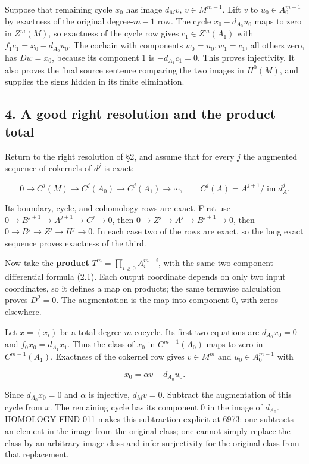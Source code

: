 \documentclass[11pt]{article}
\begin{document}
Suppose that remaining cycle \(x_0\) has image \(d_Mv\), \(v\in M^{m-1}\). Lift \(v\) to \(u_0\in A_0^{m-1}\) by exactness of the original degree-\(m-1\) row. The cycle \(x_0-d_{A_0}u_0\) maps to zero in \(Z^m(M)\), so exactness of the cycle row gives \(c_1\in Z^m(A_1)\) with \(f_1c_1=x_0-d_{A_0}u_0\). The cochain with components \(w_0=u_0,w_1=c_1\), all others zero, has \(Dw=x_0\), because its component 1 is \(-d_{A_1}c_1=0\). This proves injectivity. It also proves the final source sentence comparing the two images in \(H^0(M)\), and supplies the signs hidden in its finite elimination.

\subsection{4. A good right resolution and the product total}\label{note-08-a-good-right-resolution-and-the-product-total}

Return to the right resolution of §2, and assume that for every \(j\) the augmented sequence of cokernels of \(d^j\) is exact:

\[
0\to C^j(M)\to C^j(A_0)\to C^j(A_1)\to\cdots,
\qquad C^j(A)=A^{j+1}/\operatorname{im}d_A^j.
\]

Its boundary, cycle, and cohomology rows are exact. First use \(0\to B^{j+1}\to A^{j+1}\to C^j\to0\), then \(0\to Z^j\to A^j\to B^{j+1}\to0\), then \(0\to B^j\to Z^j\to H^j\to0\). In each case two of the rows are exact, so the long exact sequence proves exactness of the third.

Now take the \textbf{product} \(T^m=\prod_{i\geq0}A_i^{m-i}\), with the same two-component differential formula (2.1). Each output coordinate depends on only two input coordinates, so it defines a map on products; the same termwise calculation proves \(D^2=0\). The augmentation is the map into component 0, with zeros elsewhere.

Let \(x=(x_i)\) be a total degree-\(m\) cocycle. Its first two equations are \(d_{A_0}x_0=0\) and \(f_0x_0=d_{A_1}x_1\). Thus the class of \(x_0\) in \(C^{m-1}(A_0)\) maps to zero in \(C^{m-1}(A_1)\). Exactness of the cokernel row gives \(v\in M^m\) and \(u_0\in A_0^{m-1}\) with

\[
x_0=\alpha v+d_{A_0}u_0.
\]

Since \(d_{A_0}x_0=0\) and \(\alpha\) is injective, \(d_Mv=0\). Subtract the augmentation of this cycle from \(x\). The remaining cycle has its component 0 in the image of \(d_{A_0}\). HOMOLOGY-FIND-011 makes this subtraction explicit at 6973: one subtracts an element in the image from the original class; one cannot simply replace the class by an arbitrary image class and infer surjectivity for the original class from that replacement.
\end{document}

